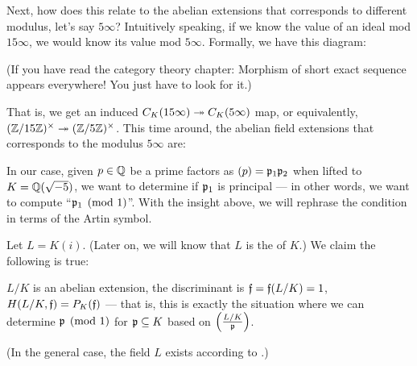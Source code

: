 \begin{example}
	Next, how does this relate to the abelian extensions that corresponds to different modulus,
	let's say $5 \infty$?
	Intuitively speaking, if we know the value of an ideal mod $15 \infty$, we would know its
	value mod $5 \infty$. Formally, we have this diagram:
	\begin{center}
	\end{center}
	(If you have read the category theory chapter:
	Morphism of short exact sequence appears everywhere! You just have to look for it.)

	That is, we get an induced $C_K(15 \infty) \twoheadrightarrow C_K(5 \infty)$ map,
	or equivalently, $(\mathbb Z/15\mathbb Z)^\times \twoheadrightarrow (\mathbb Z/5\mathbb Z)^\times$.
	This time around, the abelian field extensions that corresponds to the modulus $5 \infty$ are:
	\begin{center}
	\end{center}
\end{example}

In our case, given $p \in \mathbb Q$ be a prime factors as $(p) = \mathfrak p_1 \mathfrak p_2$ when lifted to
$K = \mathbb Q(\sqrt{-5})$, we want to determine if $\mathfrak p_1$ is principal --- in other words, we want to
compute ``$\mathfrak p_1 \pmod{1}$''.
With the insight above, we will rephrase the condition in terms of the Artin symbol.

Let $L = K(i)$. (Later on, we will know that $L$ is the  of $K$.)
We claim the following is true:
\begin{itemize}
	\ii $L/K$ is an abelian extension,
	\ii the discriminant is $\mathfrak f = \mathfrak f(L/K) = 1$,
	\ii $H(L/K, \mathfrak f) = P_K(\mathfrak f)$ --- that is, this is exactly the situation where we can determine
	$\mathfrak p \pmod{1}$ for $\mathfrak p \subseteq K$ based on $\left(\frac{L/K}{\mathfrak p}\right)$.
\end{itemize}

(In the general case, the field $L$ exists according to .)

